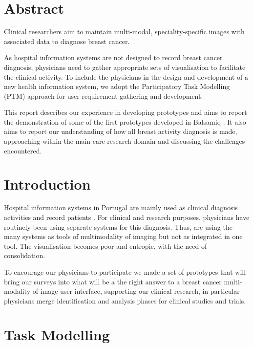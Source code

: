 \section{Abstract}

Clinical researchers aim to maintain multi-modal, speciality-specific images with associated data to diagnose breast cancer.

As hospital information systems are not designed to record breast cancer diagnosis, physicians need to gather appropriate sets of visualisation to facilitate the clinical activity. To include the physicians in the design and development of a new health information system, we adopt the Participatory Task Modelling (PTM) \cite{o2004participatory, keungparticipatory} approach for user requirement gathering and development.

This report describes our experience in developing prototypes and aims to report the demonstration of some of the first prototypes developed in Balsamiq \cite{Balsamiq}. It also aims to report our understanding of how all breast activity diagnosis is made, approaching within the main care research domain and discussing the challenges encountered. 

\clearpage

\section{Introduction}

Hospital information systems in Portugal are mainly used as clinical diagnosis activities and record patients \cite{JARDIM2013940}. For clinical and research purposes, physicians have routinely been using separate systems for this diagnosis. Thus, are using the many systems as tools of multimodality of imaging but not as integrated in one tool. The visualisation becomes poor and entropic, with the need of consolidation.

To encourage our physicians to participate we made a set of prototypes that will bring our surveys into what will be a the right answer to a breast cancer multi-modality of image user interface, supporting our clinical research, in particular physicians merge identification and analysis phases for clinical studies and trials.

\clearpage

\section{Task Modelling}

